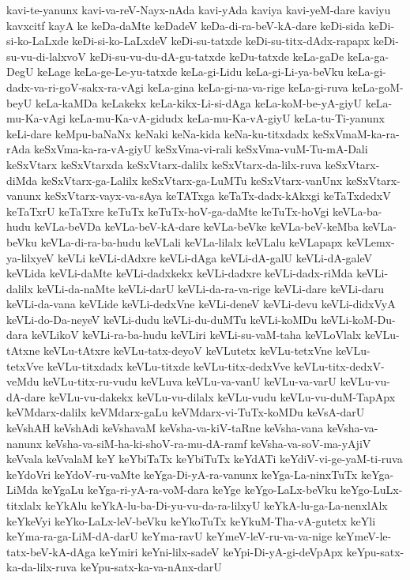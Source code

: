 {kavi-te-yanunx
kavi-va-reV-Nayx-nAda
kavi-yAda
kaviya
kavi-yeM-dare
kaviyu
kavxcitf
kayA
ke
keDa-daMte
keDadeV
keDa-di-ra-beV-kA-dare
keDi-sida
keDi-si-ko-LaLxde
keDi-si-ko-LaLxdeV
keDi-su-tatxde
keDi-su-titx-dAdx-rapapx
keDi-su-vu-di-lalxvoV
keDi-su-vu-du-dA-gu-tatxde
keDu-tatxde
keLa-gaDe
keLa-ga-DegU
keLage
keLa-ge-Le-yu-tatxde
keLa-gi-Lidu
keLa-gi-Li-ya-beVku
keLa-gi-dadx-va-ri-goV-sakx-ra-vAgi
keLa-gina
keLa-gi-na-va-rige
keLa-gi-ruva
keLa-goM-beyU
keLa-kaMDa
keLakekx
keLa-kikx-Li-si-dAga
keLa-koM-be-yA-giyU
keLa-mu-Ka-vAgi
keLa-mu-Ka-vA-gidudx
keLa-mu-Ka-vA-giyU
keLa-tu-Ti-yanunx
keLi-dare
keMpu-baNaNx
keNaki
keNa-kida
keNa-ku-titxdadx
keSxVmaM-ka-ra-rAda
keSxVma-ka-ra-vA-giyU
keSxVma-vi-rali
keSxVma-vuM-Tu-mA-Dali
keSxVtarx
keSxVtarxda
keSxVtarx-dalilx
keSxVtarx-da-lilx-ruva
keSxVtarx-diMda
keSxVtarx-ga-Lalilx
keSxVtarx-ga-LuMTu
keSxVtarx-vanUnx
keSxVtarx-vanunx
keSxVtarx-vayx-va-sAya
keTATxga
keTaTx-dadx-kAkxgi
keTaTxdedxV
keTaTxrU
keTaTxre
keTuTx
keTuTx-hoV-ga-daMte
keTuTx-hoVgi
keVLa-ba-hudu
keVLa-beVDa
keVLa-beV-kA-dare
keVLa-beVke
keVLa-beV-keMba
keVLa-beVku
keVLa-di-ra-ba-hudu
keVLali
keVLa-lilalx
keVLalu
keVLapapx
keVLemx-ya-lilxyeV
keVLi
keVLi-dAdxre
keVLi-dAga
keVLi-dA-galU
keVLi-dA-galeV
keVLida
keVLi-daMte
keVLi-dadxkekx
keVLi-dadxre
keVLi-dadx-riMda
keVLi-dalilx
keVLi-da-naMte
keVLi-darU
keVLi-da-ra-va-rige
keVLi-dare
keVLi-daru
keVLi-da-vana
keVLide
keVLi-dedxVne
keVLi-deneV
keVLi-devu
keVLi-didxVyA
keVLi-do-Da-neyeV
keVLi-dudu
keVLi-du-duMTu
keVLi-koMDu
keVLi-koM-Du-dara
keVLikoV
keVLi-ra-ba-hudu
keVLiri
keVLi-su-vaM-taha
keVLoVlalx
keVLu-tAtxne
keVLu-tAtxre
keVLu-tatx-deyoV
keVLutetx
keVLu-tetxVne
keVLu-tetxVve
keVLu-titxdadx
keVLu-titxde
keVLu-titx-dedxVve
keVLu-titx-dedxV-veMdu
keVLu-titx-ru-vudu
keVLuva
keVLu-va-vanU
keVLu-va-varU
keVLu-vu-dA-dare
keVLu-vu-dakekx
keVLu-vu-dilalx
keVLu-vudu
keVLu-vu-duM-TapApx
keVMdarx-dalilx
keVMdarx-gaLu
keVMdarx-vi-TuTx-koMDu
keVsA-darU
keVshAH
keVshAdi
keVshavaM
keVsha-va-kiV-taRne
keVsha-vana
keVsha-va-nanunx
keVsha-va-siM-ha-ki-shoV-ra-mu-dA-ramf
keVsha-va-soV-ma-yAjiV
keVvala
keVvalaM
keY
keYbiTaTx
keYbiTuTx
keYdATi
keYdiV-vi-ge-yaM-ti-ruva
keYdoVri
keYdoV-ru-vaMte
keYga-Di-yA-ra-vanunx
keYga-La-ninxTuTx
keYga-LiMda
keYgaLu
keYga-ri-yA-ra-voM-dara
keYge
keYgo-LaLx-beVku
keYgo-LuLx-titxlalx
keYkAlu
keYkA-lu-ba-Di-yu-vu-da-ra-lilxyU
keYkA-lu-ga-La-nenxlAlx
keYkeVyi
keYko-LaLx-leV-beVku
keYkoTuTx
keYkuM-Tha-vA-gutetx
keYli
keYma-ra-ga-LiM-dA-darU
keYma-ravU
keYmeV-leV-ru-va-va-nige
keYmeV-le-tatx-beV-kA-dAga
keYmiri
keYni-lilx-sadeV
keYpi-Di-yA-gi-deVpApx
keYpu-satx-ka-da-lilx-ruva
keYpu-satx-ka-va-nAnx-darU
}
